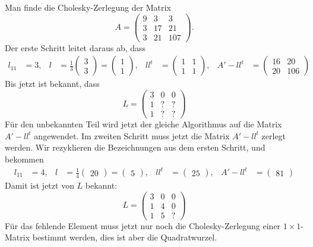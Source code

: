 \begin{beispiel}
Man finde die Cholesky-Zerlegung der Matrix
\[
A=\begin{pmatrix}
9&3&3\\
3&17&21\\
3&21&107
\end{pmatrix}.
\]
Der erste Schritt leitet daraus ab, dass
\begin{align*}
l_{11}&=3,&
l&=\frac13\begin{pmatrix}3\\3\end{pmatrix}=\begin{pmatrix}1\\1\end{pmatrix},&
ll^t&=\begin{pmatrix}1&1\\1&1\end{pmatrix},&
A'-ll^t&=\begin{pmatrix}16&20\\20&106\end{pmatrix}
\end{align*}
Bis jetzt ist bekannt, dass
\[
L=\begin{pmatrix}
3&0&0\\
1&?&?\\
1&?&?
\end{pmatrix}
\]
Für den unbekannten Teil wird jetzt der gleiche Algorithmus auf
die Matrix $A'-ll^t$ angewendet.
Im zweiten Schritt muss jetzt die Matrix $A'-ll^t$ zerlegt werden.
Wir rezyklieren die Bezeichnungen aus dem ersten Schritt, und
bekommen
\begin{align*}
l_{11}&=4,&
l&=\frac14\begin{pmatrix}20\end{pmatrix}=\begin{pmatrix}5\end{pmatrix},&
ll^t&=\begin{pmatrix}25\end{pmatrix},&
A'-ll^t&=\begin{pmatrix}81\end{pmatrix}
\end{align*}
Damit ist jetzt von $L$ bekannt:
\[
L=\begin{pmatrix}
3&0&0\\
1&4&0\\
1&5&?
\end{pmatrix}
\]
Für das fehlende Element muss jetzt nur noch die Cholesky-Zerlegung
einer $1\times 1$-Matrix bestimmt werden, dies ist aber die 
Quadratwurzel.

\end{beispiel}
